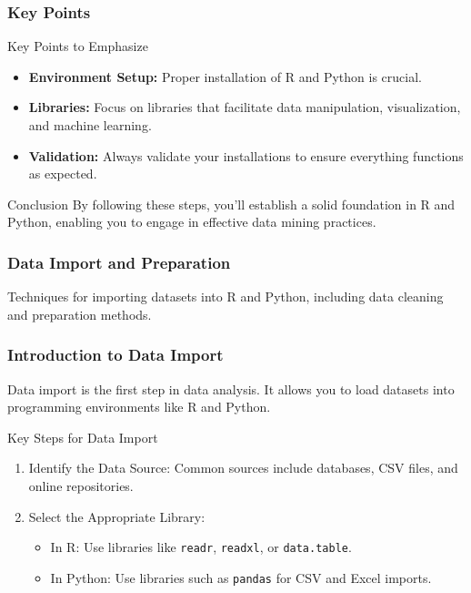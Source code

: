 \documentclass[aspectratio=169]{beamer}
\begin{document}
\begin{frame}[fragile]
    \frametitle{Key Points}
    \begin{block}{Key Points to Emphasize}
        \begin{itemize}
            \item \textbf{Environment Setup:} Proper installation of R and Python is crucial.
            \item \textbf{Libraries:} Focus on libraries that facilitate data manipulation, visualization, and machine learning.
            \item \textbf{Validation:} Always validate your installations to ensure everything functions as expected.
        \end{itemize}
    \end{block}
    
    \begin{block}{Conclusion}
    By following these steps, you'll establish a solid foundation in R and Python, enabling you to engage in effective data mining practices.
    \end{block}
\end{frame}

\begin{frame}
    \frametitle{Data Import and Preparation}
    Techniques for importing datasets into R and Python, including data cleaning and preparation methods.
\end{frame}

\begin{frame}
    \frametitle{Introduction to Data Import}
    Data import is the first step in data analysis. It allows you to load datasets into programming environments like R and Python.
    
    \begin{block}{Key Steps for Data Import}
        \begin{enumerate}
            \item Identify the Data Source: Common sources include databases, CSV files, and online repositories.
            \item Select the Appropriate Library:
                \begin{itemize}
                    \item In R: Use libraries like \texttt{readr}, \texttt{readxl}, or \texttt{data.table}.
                    \item In Python: Use libraries such as \texttt{pandas} for CSV and Excel imports.
                \end{itemize}
        \end{enumerate}
    \end{block}
\end{frame}
\end{document}

